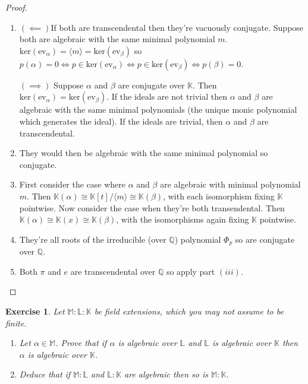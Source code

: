 \documentclass{article}
\newtheorem{exercise}[theorem]{Exercise}
\begin{document}
\begin{proof}
    \begin{enumerate}[label=(\roman*)]
        \item $(\impliedby)$If both are transcendental then they're vacuously conjugate. Suppose both are algebraic with the same minimal polynomial $m$. $\text{ker}(\text{ev}_\alpha)=\langle m\rangle=\text{ker}(\text{ev}_\beta)$ so $p(\alpha)=0\iff p\in\text{ker}(\text{ev}_\alpha)\iff p\in \text{ker}(\text{ev}_\beta)\iff p(\beta)=0$.
        
        $(\implies)$ Suppose $\alpha$ and $\beta$ are conjugate over $\mathbb{K}$. Then $\text{ker}(\text{ev}_\alpha)=\text{ker}(\text{ev}_\beta)$. If the ideals are not trivial then $\alpha$ and $\beta$ are algebraic with the same minimal polynomials (the unique monic polynomial which generates the ideal). If the ideals are trivial, then $\alpha$ and $\beta$ are transcendental.
        \item They would then be algebraic with the same minimal polynomial so conjugate.
        \item First consider the case where $\alpha$ and $\beta$ are algebraic with minimal polynomial $m$. Then $\mathbb{K}(\alpha)\cong \mathbb{K}[t]/\langle m\rangle\cong \mathbb{K}(\beta)$, with each isomorphism fixing $\mathbb{K}$ pointwise.
        Now consider the case when they're both transendental. Then $\mathbb{K}(\alpha)\cong\mathbb{K}(x)\cong \mathbb{K}(\beta)$, with the isomorphisms again fixing $\mathbb{K}$ pointwise.
        \item They're all roots of the irreducible (over $\mathbb{Q}$) polynomial $\Phi_p$ so are conjugate over $\mathbb{Q}$.
        \item Both $\pi$ and $e$ are transcendental over $\mathbb{Q}$ so apply part $(iii)$.
    \end{enumerate}
\end{proof}

\begin{exercise}
Let $\mathbb{M}:\mathbb{L}:\mathbb{K}$ be field extensions, which you may not assume to be finite.
\begin{enumerate}[label=(\roman*)]
    \item Let $\alpha\in \mathbb{M}$. Prove that if $\alpha$ is algebraic over $\mathbb{L}$ and $\mathbb{L}$ is algebraic over $\mathbb{K}$ then $\alpha$ is algebraic over $\mathbb{K}$.
    \item Deduce that if $\mathbb{M}:\mathbb{L}$ and $\mathbb{L}:\mathbb{K}$ are algebraic then so is $\mathbb{M}:\mathbb{K}$.
\end{enumerate}
\end{exercise}
\end{document}
